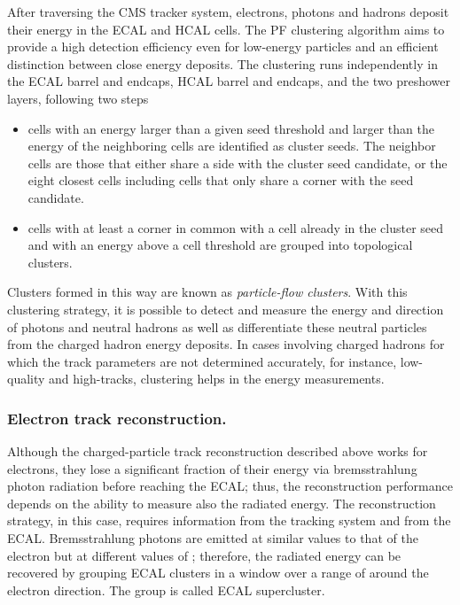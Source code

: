 \noindent After traversing the CMS tracker system, electrons, photons and hadrons deposit their energy in the ECAL and HCAL cells. The PF clustering algorithm aims to provide a high detection efficiency even for low-energy particles and an efficient distinction between close energy deposits. The clustering runs independently in the ECAL barrel and endcaps, HCAL barrel and endcaps, and the two preshower layers, following two steps
\begin{itemize}
\item cells with an energy larger than a given seed threshold and larger than the energy of the neighboring cells are identified as cluster seeds. The neighbor cells are those that either share a side with the cluster seed candidate, or the eight closest cells including cells that only share a corner with the seed candidate.
\item cells with at least a corner in common with a cell already in the cluster seed and with an energy above a cell threshold are grouped into topological clusters.
\end{itemize}

\noindent Clusters formed in this way are known as \textit{particle-flow clusters}. With this clustering strategy, it is possible to detect and measure the energy and direction of photons and neutral hadrons as well as differentiate these neutral particles from the charged hadron energy deposits. In cases involving charged hadrons for which the track parameters are not determined accurately, for instance, low-quality and high-\pt tracks, clustering helps in the energy measurements. 

\subsubsection*{Electron track reconstruction.}

\noindent Although the charged-particle track reconstruction described above works for electrons, they lose a significant fraction of their energy via bremsstrahlung photon radiation before reaching the ECAL; thus, the reconstruction performance depends on the ability to measure also the radiated energy. The reconstruction strategy, in this case, requires information from the tracking system and from the ECAL. Bremsstrahlung photons are emitted at similar \etac values to that of the electron but at different values of \phic; therefore, the radiated energy can be recovered by grouping ECAL clusters in a \etac window over a range of \phic around the electron direction. The group is called ECAL supercluster.\\


